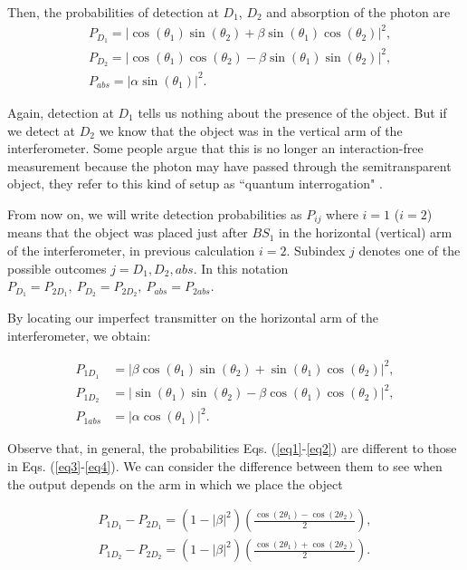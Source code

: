 \documentclass[12pt]{book}
\begin{document}
Then, the probabilities of detection at $D_1$, $D_2$ and absorption of the photon are 
\begin{align}
& P_{D_{1}}=|\cos(\theta_{1})\sin(\theta_{2})+\beta \sin(\theta_{1})\cos(\theta_{2})|^2, \label{eq1}\\
& P_{D_{2}}=|\cos(\theta_{1})\cos(\theta_{2})-\beta \sin(\theta_{1})\sin(\theta_{2})|^2, \\
& P_{abs}=|\alpha \sin(\theta_{1})|^2. \label{eq2}
\end{align}

Again, detection at $D_1$ tells us nothing about the presence of the object. But if we detect at $D_2$ we know that the object was in the vertical arm of the interferometer. Some people argue that this is no longer an interaction-free measurement because the photon may have passed through the semitransparent object, they refer to this kind of setup as ``quantum interrogation" \cite{QI1,QI2}. 


From now on, we will write detection probabilities as $P_{ij}$ where $i=1$ ($i=2$) means that the object was placed just after $BS_1$ in the horizontal (vertical) arm of the interferometer, in previous calculation $i=2$. Subindex $j$ denotes one of the possible outcomes $j=D_{1},D_{2},abs$. In this notation $P_{D_1}= P_{2D_{1}}, ~P_{D_2}= P_{2D_{2}}, ~P_{abs}= P_{2abs} $. 

By locating our imperfect transmitter on the horizontal arm of the interferometer, we obtain:

\begin{align}
P_{1D_{1}}&=|\beta\cos(\theta_{1})\sin(\theta_{2}) +\sin(\theta_{1})\cos(\theta_{2})|^2,\label{eq3} \\
P_{1D_{2}}&=|\sin(\theta_{1})\sin(\theta_{2})-\beta \cos(\theta_{1})\cos(\theta_{2})|^2,\\
P_{1abs}&=|\alpha \cos(\theta_{1})|^2. \label{eq4}
\end{align}



Observe that, in general, the probabilities Eqs. (\ref{eq1}-\ref{eq2}) are different to those in Eqs. (\ref{eq3}-\ref{eq4}). We can consider the difference between them to see when the output depends on the arm in which we place the object


\begin{align}
P_{1D_{1}}-P_{2D_{1}}=(1-|\beta|^2)\left(\frac{\cos(2 \theta_{1})-\cos(2 \theta_{2})}{2}\right), \\
P_{1D_{2}}-P_{2D_{2}}=(1-|\beta|^2)\left(\frac{\cos(2 \theta_{1})+\cos(2 \theta_{2})}{2}\right).
\end{align}
\end{document}

